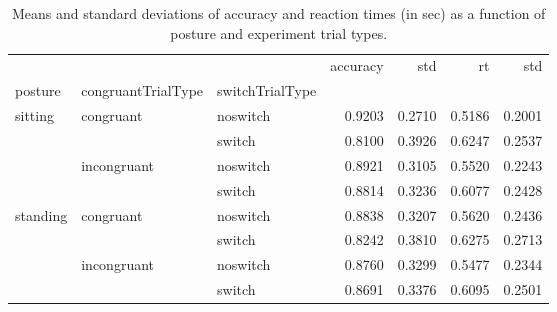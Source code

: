 \begin{table}
\centering
\caption{Means and standard deviations of accuracy and reaction times (in sec) as a function of posture and experiment trial types.}
\label{table-task-switching-replication-reaction-time}
\begin{tabular}{lllrrrr}
\toprule
         &             &        & accuracy &    std &     rt &    std \\
posture & congruantTrialType & switchTrialType &          &        &        &        \\
\midrule
sitting & congruant & noswitch &   0.9203 & 0.2710 & 0.5186 & 0.2001 \\
         &             & switch &   0.8100 & 0.3926 & 0.6247 & 0.2537 \\
         & incongruant & noswitch &   0.8921 & 0.3105 & 0.5520 & 0.2243 \\
         &             & switch &   0.8814 & 0.3236 & 0.6077 & 0.2428 \\
standing & congruant & noswitch &   0.8838 & 0.3207 & 0.5620 & 0.2436 \\
         &             & switch &   0.8242 & 0.3810 & 0.6275 & 0.2713 \\
         & incongruant & noswitch &   0.8760 & 0.3299 & 0.5477 & 0.2344 \\
         &             & switch &   0.8691 & 0.3376 & 0.6095 & 0.2501 \\
\bottomrule
\end{tabular}
\end{table}

